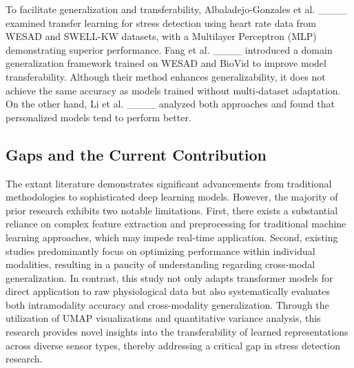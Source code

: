 To facilitate generalization and transferability, Albaladejo-Gonzales et al. ____ examined transfer learning for stress detection using heart rate data from WESAD and SWELL-KW datasets, with a Multilayer Perceptron (MLP) demonstrating superior performance. Fang et al. ____ introduced a domain generalization framework trained on WESAD and BioVid to improve model transferability. Although their method enhances generalizability, it does not achieve the same accuracy as models trained without multi-dataset adaptation. On the other hand, Li et al. ____ analyzed both approaches and found that personalized models tend to perform better.

\subsection{Gaps and the Current Contribution}

The extant literature demonstrates significant advancements from traditional methodologies to sophisticated deep learning models. However, the majority of prior research exhibits two notable limitations. First, there exists a substantial reliance on complex feature extraction and preprocessing for traditional machine learning approaches, which may impede real-time application. Second, existing studies predominantly focus on optimizing performance within individual modalities, resulting in a paucity of understanding regarding cross-modal generalization. In contrast, this study not only adapts transformer models for direct application to raw physiological data but also systematically evaluates both intramodality accuracy and cross-modality generalization. Through the utilization of UMAP visualizations and quantitative variance analysis, this research provides novel insights into the transferability of learned representations across diverse sensor types, thereby addressing a critical gap in stress detection research.